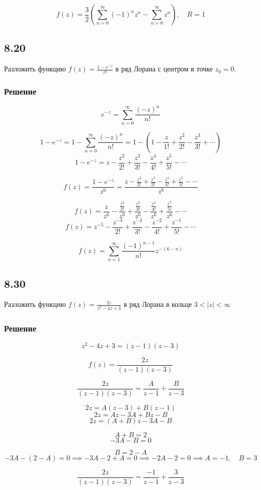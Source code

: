 \documentclass[12pt,a4paper]{article}
\begin{document}
\[
f(z) = \frac{3}{2} \left( \sum_{n=0}^{\infty} (-1)^n z^n - \sum_{n=0}^{\infty} z^n \right), \quad R = 1
\]
\subsection*{8.20}
Разложить функцию $f(z)=\frac{1-e^{-z}}{z^6}$ в ряд Лорана с центром в точке $z_0=0$. 
\subsubsection*{Решение}
\[
e^{-z} = \sum_{n=0}^{\infty} \frac{(-z)^n}{n!}
\]

\[
1 - e^{-z} = 1 - \sum_{n=0}^{\infty} \frac{(-z)^n}{n!} = 1 - \left( 1 - \frac{z}{1!} + \frac{z^2}{2!} - \frac{z^3}{3!} + \cdots \right)
\]
\[
1 - e^{-z} = z - \frac{z^2}{2!} + \frac{z^3}{3!} - \frac{z^4}{4!} + \frac{z^5}{5!} - \cdots
\]

\[
f(z) = \frac{1 - e^{-z}}{z^6} = \frac{z - \frac{z^2}{2!} + \frac{z^3}{3!} - \frac{z^4}{4!} + \frac{z^5}{5!} - \cdots}{z^6}
\]

\[
f(z) = \frac{z}{z^6} - \frac{\frac{z^2}{2!}}{z^6} + \frac{\frac{z^3}{3!}}{z^6} - \frac{\frac{z^4}{4!}}{z^6} + \frac{\frac{z^5}{5!}}{z^6} - \cdots
\]
\[
f(z) = z^{-5} - \frac{z^{-4}}{2!} + \frac{z^{-3}}{3!} - \frac{z^{-2}}{4!} + \frac{z^{-1}}{5!} - \cdots
\]

\[
f(z) = \sum_{n=1}^{\infty} \frac{(-1)^{n-1}}{n!} z^{-(6-n)}
\]
\subsection*{8.30}
Разложить функцию $f(z)=\frac{2z}{z^2-4z+3}$ в ряд Лорана в кольце $3<|z|<\infty$
\subsubsection*{Решение}
\[
z^2 - 4z + 3 = (z - 1)(z - 3)
\]

\[
f(z) = \frac{2z}{(z - 1)(z - 3)}
\]

\[
\frac{2z}{(z - 1)(z - 3)} = \frac{A}{z - 1} + \frac{B}{z - 3}
\]

\[
2z = A(z - 3) + B(z - 1)
\]
\[
2z = Az - 3A + Bz - B
\]
\[
2z = (A + B)z - 3A - B
\]

\[
A + B = 2
\]
\[
-3A - B = 0
\]

\[
B = 2 - A
\]
\[
-3A - (2 - A) = 0 \implies -3A - 2 + A = 0 \implies -2A - 2 = 0 \implies A = -1, \quad B = 3
\]

\[
\frac{2z}{(z - 1)(z - 3)} = \frac{-1}{z - 1} + \frac{3}{z - 3}
\]
\end{document}
